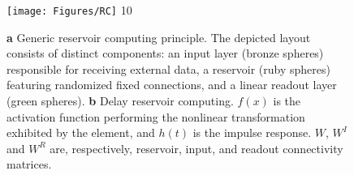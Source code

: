 \documentclass{WileyMSP-template}
\begin{document}



\begin{figure}[h]
  \centering
  \texttt{[image: Figures/RC]}
10  \caption{\textbf{a} Generic reservoir computing principle. The depicted layout consists of distinct components: an input layer (bronze spheres) responsible for receiving external data, a reservoir (ruby spheres) featuring randomized fixed connections, and a linear readout layer (green spheres). \textbf{b} Delay reservoir computing. $f(x)$ is the activation function performing the nonlinear transformation exhibited by the element, and $h(t)$ is the impulse response. $W$, $W^I$ and $W^R$ are, respectively, reservoir, input, and readout connectivity matrices.}
  \label{fig:rc_scheme}
\end{figure}
\end{document}
